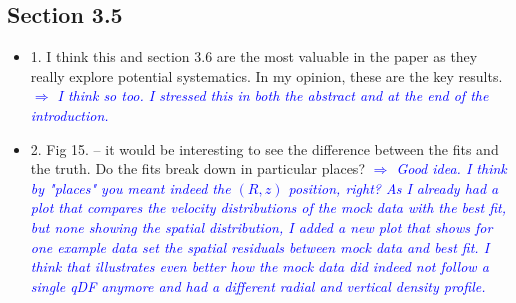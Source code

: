 \documentclass[10pt,a4paper]{article}
\newcommand{\Comment}[1]{\textsl{\textcolor{Blue}{$\Longrightarrow$ {#1}}}}
\begin{document}
\subsection{Section 3.5}
\begin{itemize}
\item 1. I think this and section 3.6 are the most valuable in the paper as they really explore potential systematics. In my opinion, these are the key results. \Comment{I think so too. I stressed this in both the abstract and at the end of the introduction.}
\item 2. Fig 15. -- it would be interesting to see the difference between the fits and the truth. Do the fits break down in particular places? \Comment{Good idea. I think by "places" you meant indeed the $(R,z)$ position, right? As I already had a plot that compares the velocity distributions of the mock data with the best fit, but none showing the spatial distribution, I added a new plot that shows for one example data set the spatial residuals between mock data and best fit. I think that illustrates even better how the mock data did indeed not follow a single qDF anymore and had a different radial and vertical density profile.}
\end{itemize}
\end{document}
